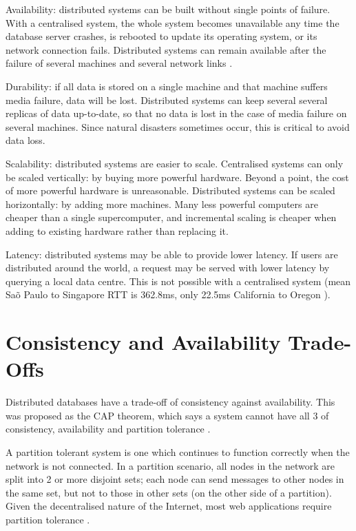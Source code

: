 \documentclass[12pt,a4paper,twoside,openany]{report}
\begin{document}
\begin{description}

\item{Availability}: distributed systems can be built without single points of failure. With a centralised system, the whole system becomes unavailable any time the database server crashes, is rebooted to update its operating system, or its network connection fails. Distributed systems can remain available after the failure of several machines and several network links \cite{bacon2003operating}. %

\item{Durability}: if all data is stored on a single machine and that machine suffers media failure, data will be lost. Distributed systems can keep several several replicas of data up-to-date, so that no data is lost in the case of media failure on several machines. Since natural disasters sometimes occur, this is critical to avoid data loss.

\item{Scalability}: distributed systems are easier to scale. Centralised systems can only be scaled vertically: by buying more powerful hardware. Beyond a point, the cost of more powerful hardware is unreasonable. Distributed systems can be scaled horizontally: by adding more machines. Many less powerful computers are cheaper than a single supercomputer, and incremental scaling is cheaper when adding to existing hardware rather than replacing it.

\item{Latency}: distributed systems may be able to provide lower latency. If users are distributed around the world, a request may be served with lower latency by querying a local data centre. This is not possible with a centralised system (mean Sa\~o Paulo to Singapore RTT is 362.8ms, only 22.5ms California to Oregon \cite{bailis2013highly}).

\end{description}

\section{Consistency and Availability Trade-Offs}

Distributed databases have a trade-off of consistency against availability. This was proposed as the CAP theorem, which says a system cannot have all 3 of consistency, availability and partition tolerance \cite{brewer}.

A partition tolerant system is one which continues to function correctly when the network is not connected. In a partition scenario, all nodes in the network are split into 2 or more disjoint sets; each node can send messages to other nodes in the same set, but not to those in other sets (on the other side of a partition). Given the decentralised nature of the Internet, most web applications require partition tolerance \cite{hale_2010}.
\end{document}
